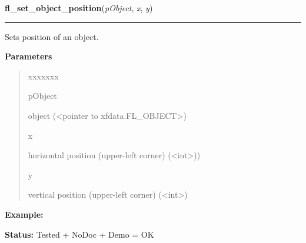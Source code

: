 \hspace{.8\funcindent}\begin{boxedminipage}{\funcwidth}

    \raggedright \textbf{fl\_set\_object\_position}(\textit{pObject}, \textit{x}, \textit{y})

    \vspace{-1.5ex}

    \rule{\textwidth}{0.5\fboxrule}
\setlength{\parskip}{2ex}
    Sets position of an object.

\setlength{\parskip}{1ex}
      \textbf{Parameters}
      \vspace{-1ex}

      \begin{quote}
        \begin{Ventry}{xxxxxxx}

          \item[pObject]

          object ({\textless}pointer to xfdata.FL\_OBJECT{\textgreater})

          \item[x]

          horizontal position (upper-left corner) 
          ({\textless}int{\textgreater}))

          \item[y]

          vertical position (upper-left corner) 
          ({\textless}int{\textgreater})

        \end{Ventry}

      \end{quote}

\textbf{Example:} 

\textbf{Status:} Tested + NoDoc + Demo = OK



    \end{boxedminipage}

    \label{xformslib:library:fl_get_object_size}

    \vspace{0.5ex}

